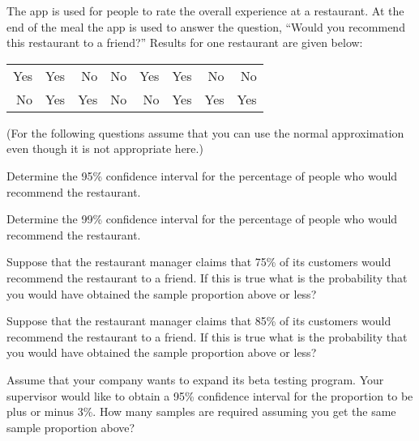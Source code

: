 \begin{problem}
\begin{subproblem}
      \vfill


    \end{subproblem}

    \clearpage

  \item The app is used for people to rate the overall experience at a
    restaurant. At the end of the meal the app is used to answer the
    question, ``Would you recommend this restaurant to a friend?''
    Results for one restaurant are given below:

    \begin{tabular}{rrrrrrrr}
      Yes & Yes & No  & No & Yes & Yes & No  & No \\
      No  & Yes & Yes & No & No  & Yes & Yes & Yes
    \end{tabular}

    (For the following questions assume that you can use the normal
    approximation even though it is not appropriate here.)

    \begin{subproblem}
    \item Determine the 95\% confidence interval for the percentage of
      people who would recommend the restaurant.

      \vfill

    \item Determine the 99\% confidence interval for the percentage of
      people who would recommend the restaurant.

      \vfill

      \clearpage

    \item Suppose that the restaurant manager claims that 75\% of its
      customers would recommend the restaurant to a friend. If this is
      true what is the probability that you would have obtained the
      sample proportion above or less?

      \vfill

    \item Suppose that the restaurant manager claims that 85\% of its
      customers would recommend the restaurant to a friend. If this is
      true what is the probability that you would have obtained the
      sample proportion above or less?

      \vfill

      \clearpage

    \item Assume that your company wants to expand its beta testing
      program. Your supervisor would like to obtain a 95\% confidence
      interval for the proportion to be plus or minus 3\%. How many
      samples are required assuming you get the same sample proportion
      above?


\end{subproblem}
\end{problem}
